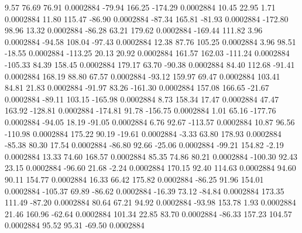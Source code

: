         9.57       76.69       76.91     0.0002884
      -79.94      166.25     -174.29     0.0002884
       10.45       22.95        1.71     0.0002884
       11.80      115.47      -86.90     0.0002884
      -87.34      165.81      -81.93     0.0002884
     -172.80       98.96       13.32     0.0002884
      -86.28       63.21      179.62     0.0002884
     -169.44      111.82        3.96     0.0002884
      -94.58      108.04      -97.43     0.0002884
       12.38       87.76      105.25     0.0002884
        3.96       98.51      -18.55     0.0002884
     -113.25       20.13       20.92     0.0002884
      161.57      162.03     -111.24     0.0002884
     -105.33       84.39      158.45     0.0002884
      179.17       63.70      -90.38     0.0002884
       84.40      112.68      -91.41     0.0002884
      168.19       88.80       67.57     0.0002884
      -93.12      159.97       69.47     0.0002884
      103.41       84.81       21.83     0.0002884
      -91.97       83.26     -161.30     0.0002884
      157.08      166.65      -21.67     0.0002884
      -89.11      103.15     -165.98     0.0002884
        8.73      158.34       17.47     0.0002884
       47.47      163.92     -128.81     0.0002884
     -174.81       91.78     -156.75     0.0002884
        1.01       65.16     -177.76     0.0002884
      -94.05       18.19      -91.05     0.0002884
        6.76       92.67     -113.57     0.0002884
       10.87       96.56     -110.98     0.0002884
      175.22       90.19      -19.61     0.0002884
       -3.33       63.80      178.93     0.0002884
      -85.38       80.30       17.54     0.0002884
      -86.80       92.66      -25.06     0.0002884
      -99.21      154.82       -2.19     0.0002884
       13.33       74.60      168.57     0.0002884
       85.35       74.86       80.21     0.0002884
     -100.30       92.43       23.15     0.0002884
      -96.60       21.68       -2.24     0.0002884
      170.15       92.40      114.63     0.0002884
       94.60       90.11      154.77     0.0002884
       16.33       66.42      175.82     0.0002884
      -86.25       91.96      154.01     0.0002884
     -105.37       69.89      -86.62     0.0002884
      -16.39       73.12      -84.84     0.0002884
      173.35      111.49      -87.20     0.0002884
       80.64       67.21       94.92     0.0002884
      -93.98      153.78        1.93     0.0002884
       21.46      160.96      -62.64     0.0002884
      101.34       22.85       83.70     0.0002884
      -86.33      157.23      104.57     0.0002884
       95.52       95.31      -69.50     0.0002884
